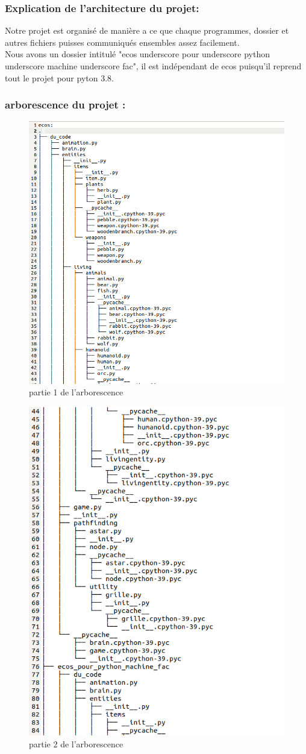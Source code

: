 \documentclass[a4paper, 11pt]{article}
\begin{document}
\subsubsection{Explication de l'architecture du projet:}
Notre projet est organisé de manière a ce que chaque programmes, dossier et autres fichiers puisses communiqués ensembles assez facilement.\\
Nous avons un dossier intitulé "ecos underscore pour underscore python underscore machine underscore fac", il est indépendant de ecos puisqu'il reprend tout le projet pour pyton 3.8.\\
\newpage

\subsubsection{arborescence du projet :}
\begin{figure}[ht!]
 \centering
 \includegraphics[width=0.5\linewidth]{images/arborecsens/arbrepart1.png}
 \caption{partie 1 de l'arborescence}
 \label{fig::example::one}
\end{figure}
\begin{figure}[ht!]
 \centering
 \includegraphics[width=0.5\linewidth]{images/arborecsens/arbrepart2.png}
 \caption{partie 2 de l'arborescence}
 \label{fig::example::one}
\end{figure}
\end{document}
